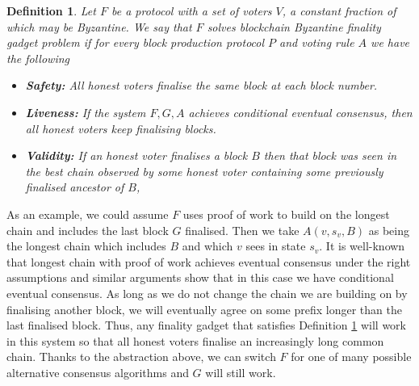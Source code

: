 \documentclass{article}
\newtheorem{definition}[theorem]{Definition}
\begin{document}
\begin{definition} \label{def:finality-gadget} 
Let $F$ be a protocol  with a set of voters $V$, a constant fraction of which may be Byzantine.
We say that $F$ solves {\em blockchain Byzantine finality gadget problem} if for every block production protocol $P$ and voting rule $A$ we have the following


\begin{itemize}
\item{\bf Safety:} All honest voters finalise the same block at each block number.
\item{\bf Liveness:} If the system $F, G, A$ achieves conditional eventual consensus, then all honest voters keep finalising blocks.
\item{\bf Validity:} If an honest voter finalises a block $B$ then that block was seen in the best chain observed by some honest voter containing some previously finalised ancestor of $B$,
\end{itemize}

\end{definition}


As an example, we could assume $F$ uses proof of work to build on the longest chain and includes the last block $G$ finalised. Then we take $A(v,s_v,B)$ as being the longest chain which includes $B$ and which $v$ sees in state $s_v$. It is well-known \cite{nakamoto08bitcoin} that longest chain with proof of work achieves eventual consensus under the right assumptions and similar arguments show that in this case we have conditional eventual consensus.
As long as we do not change the chain we are building on by finalising another block, we will eventually agree on some prefix longer than the last finalised block.
Thus, any finality gadget that satisfies Definition \ref{def:finality-gadget} will work in this system so that all honest voters finalise an increasingly long common chain.
Thanks to the abstraction above, we can switch $F$ for one of many possible alternative consensus algorithms and $G$ will still work.
\end{document}
